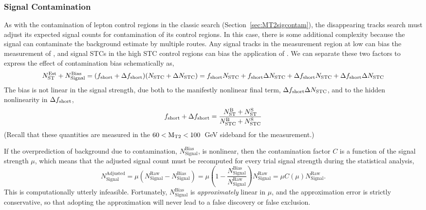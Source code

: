    \subsubsection{Signal Contamination} \label{sec:distrackssigcontam}

    As with the contamination of lepton control regions in the classic search (Section~\ref{sec:MT2sigcontam}), the disappearing tracks search must adjust its expected signal counts for contamination of its control regions.
    In this case, there is some additional complexity because the signal can contaminate the background estimate by multiple routes.
    Any signal tracks in the \fshort measurement region at low \mttwo can bias the measurement of \fshort, and signal STCs in the high \mttwo STC control regions can bias the application of \fshort.
    We can separate these two factors to express the effect of contamination bias schematically as,
    \begin{equation}
      N_{\mathrm{ST}}^{\mathrm{Est}} + N_{\mathrm{Signal}}^{\mathrm{Bias}} = (f_{\mathrm{short}}+\Delta f_{\mathrm{short}})(N_{\mathrm{STC}}+\Delta N_{\mathrm{STC}}) = f_{\mathrm{short}} N_{\mathrm{STC}}+f_{\mathrm{short}}\Delta N_{\mathrm{STC}} + \Delta f_{\mathrm{short}} N_{\mathrm{STC}} + \Delta f_{\mathrm{short}}\Delta N_{\mathrm{STC}}
      \label{eqn:fullsigcontam}
    \end{equation}
    The bias is not linear in the signal strength, due both to the manifestly nonlinear final term, $\Delta f_{\mathrm{short}}\Delta N_{\mathrm{STC}}$, and to the hidden nonlinearity in $\Delta f_{\mathrm{short}}$, 
    \begin{equation}
      f_{\mathrm{short}} + \Delta f_{\mathrm{short}} = \frac{N_{\mathrm{ST}}^{\mathrm{B}}+N_{\mathrm{ST}}^{\mathrm{S}}}{N_{\mathrm{STC}}^{\mathrm{B}}+N_{\mathrm{STC}}^{\mathrm{S}}}
    \end{equation}
    (Recall that these quantities are measured in the $60 < \mathrm{M_{T2}} < 100$~GeV sideband for the \fshort measurement.)
    
    If the overprediction of background due to contamination, $N_{\mathrm{Signal}}^{\mathrm{Bias}}$, is nonlinear, then the contamination factor $C$ is a function of the signal strength $\mu$, which means that the adjusted signal count must be recomputed for every trial signal strength during the statistical analysis,
    \begin{equation}
      N_{\mathrm{Signal}}^{\mathrm{Adjusted}} = \mu\left(N_{\mathrm{Signal}}^{\mathrm{Raw}}-N_{\mathrm{Signal}}^{\mathrm{Bias}}\right) = \mu \left(1-\frac{N_{\mathrm{Signal}}^{\mathrm{Bias}}}{N_{\mathrm{Signal}}^{\mathrm{Raw}}}\right)N_{\mathrm{Signal}}^{\mathrm{Raw}} = \mu C(\mu) N_{\mathrm{Signal}}^{\mathrm{Raw}}.
    \end{equation}
    This is computationally utterly infeasible.
    Fortunately, $N_{\mathrm{Signal}}^{\mathrm{Bias}}$ is {\it approximately} linear in $\mu$, and the approximation error is strictly conservative, so that adopting the approximation will never lead to a false discovery or false exclusion.
    
